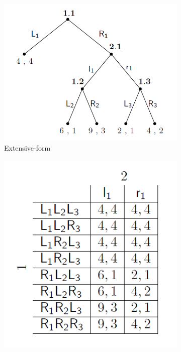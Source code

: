 \begin{figure}[H]
\begin{subfigure}[t]{0.3\textwidth}
 \includegraphics[width=\textwidth]{images/img_1_2_01.png}
 \caption{Extensive-form}
\end{subfigure}\hfill
\begin{subfigure}[t]{0.3\textwidth}
 \includegraphics[width=\textwidth]{images/img_1_2_02.png}

\end{subfigure}
\end{figure}
